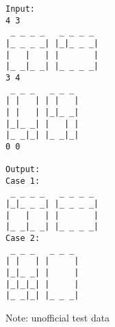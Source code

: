 \begin{verbatim}
Input:
4 3
 _ _ _ _   _ _ _ _ 
|_ _ _ _| |_|_ _ _|
|   |   | |       |
|_ _|_ _| |_ _ _ _|
3 4
 _ _ _   _ _ _ 
| |   | | |   |
| |   | |_|_ _|
|_|_ _| |   | |
|_ _|_| |_ _|_|
0 0

Output:
Case 1:
 _ _ _ _   _ _ _ _ 
|_|_ _ _| |_ _ _ _|
|   |   | |       |
|_ _|_ _| |_ _ _ _|
Case 2:
 _ _ _   _ _ _ 
| |   | |     |
|_|_ _| |     |
|_|_|_| |     |
|_ _|_| |_ _ _|

\end{verbatim}

Note: unofficial test data